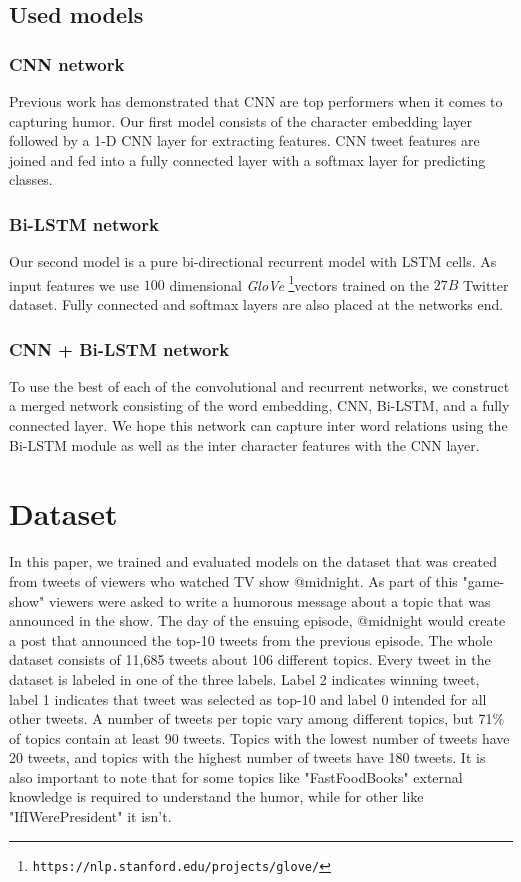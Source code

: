\documentclass[10pt, a4paper]{article}
\begin{document}
\subsection{Used models}

\subsubsection{CNN network}
Previous work\cite{onaj_rad_s_cnn} has demonstrated that CNN are top performers
when it comes to capturing humor. Our first model consists of the character
embedding layer followed by a 1-D CNN layer for extracting features. CNN tweet
features are joined and fed into a fully connected layer with a softmax layer
for predicting classes. 

\subsubsection{Bi-LSTM network}
Our second model is a pure bi-directional recurrent model with LSTM cells. As
input features we use $100$ dimensional \emph{GloVe}
\citep{GLove}\footnote{\texttt{https://nlp.stanford.edu/projects/glove/}}vectors trained on the $27B$
Twitter dataset. Fully connected and softmax layers are also placed at the
networks end.

\subsubsection{CNN + Bi-LSTM network}
To use the best of each of the convolutional and recurrent networks, we
construct a merged network consisting of the word embedding, CNN, Bi-LSTM, and
a fully connected layer. We hope this network can capture inter word relations
using the Bi-LSTM module as well as the inter character features with the CNN
layer.

\section{Dataset}

In this paper, we trained and evaluated models on the dataset that was created from tweets of viewers who watched TV show @midnight. As part of this "game-show" viewers were asked to write a humorous message about a topic that was announced in the show. The day of the ensuing episode, @midnight would create a post that announced the top-10 tweets from the previous episode. The whole dataset consists of 11,685 tweets about 106 different topics. Every tweet in the dataset is labeled in one of the three labels. Label 2 indicates winning tweet, label 1 indicates that tweet was selected as top-10 and label 0 intended for all other tweets. A number of tweets per topic vary among different topics, but 71\% of topics contain at least 90 tweets. Topics with the lowest number of tweets have 20 tweets, and topics with the highest number of tweets have 180 tweets. It is also important to note that for some topics like "FastFoodBooks" external knowledge is required to understand the humor, while for other like "IfIWerePresident" it isn't.
\end{document}
